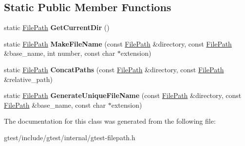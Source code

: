 \subsection*{Static Public Member Functions}
\begin{DoxyCompactItemize}
\item 
\mbox{\label{classtesting_1_1internal_1_1FilePath_a0f7b48e493656679cb82a2b679620c4e}} 
static \hyperlink{classtesting_1_1internal_1_1FilePath}{File\+Path} {\bfseries Get\+Current\+Dir} ()
\item 
\mbox{\label{classtesting_1_1internal_1_1FilePath_a1e7793eaae21c6629afe8be11064b111}} 
static \hyperlink{classtesting_1_1internal_1_1FilePath}{File\+Path} {\bfseries Make\+File\+Name} (const \hyperlink{classtesting_1_1internal_1_1FilePath}{File\+Path} \&directory, const \hyperlink{classtesting_1_1internal_1_1FilePath}{File\+Path} \&base\+\_\+name, int number, const char $\ast$extension)
\item 
\mbox{\label{classtesting_1_1internal_1_1FilePath_ad58aa6d8b160d0ba0b661f56f0980e26}} 
static \hyperlink{classtesting_1_1internal_1_1FilePath}{File\+Path} {\bfseries Concat\+Paths} (const \hyperlink{classtesting_1_1internal_1_1FilePath}{File\+Path} \&directory, const \hyperlink{classtesting_1_1internal_1_1FilePath}{File\+Path} \&relative\+\_\+path)
\item 
\mbox{\label{classtesting_1_1internal_1_1FilePath_ab22637ea53e3918ec814dc6a5fecd1f9}} 
static \hyperlink{classtesting_1_1internal_1_1FilePath}{File\+Path} {\bfseries Generate\+Unique\+File\+Name} (const \hyperlink{classtesting_1_1internal_1_1FilePath}{File\+Path} \&directory, const \hyperlink{classtesting_1_1internal_1_1FilePath}{File\+Path} \&base\+\_\+name, const char $\ast$extension)
\end{DoxyCompactItemize}


The documentation for this class was generated from the following file\+:\begin{DoxyCompactItemize}
\item 
gtest/include/gtest/internal/gtest-\/filepath.\+h\end{DoxyCompactItemize}
